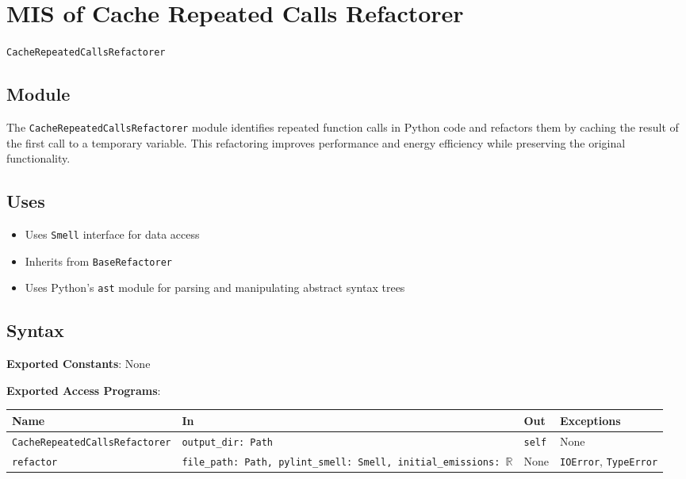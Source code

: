 \documentclass[12pt, titlepage]{article}
\begin{document}
\newpage

\section{MIS of Cache Repeated Calls Refactorer} \label{mis:CacheCalls}

\texttt{CacheRepeatedCallsRefactorer}

\subsection{Module}

The \texttt{CacheRepeatedCallsRefactorer} module identifies repeated function calls in Python code and refactors them by caching the result of the first call to a temporary variable. This refactoring improves performance and energy efficiency while preserving the original functionality.

\subsection{Uses}
\begin{itemize}
  \item Uses \texttt{Smell} interface for data access
  \item Inherits from \texttt{BaseRefactorer}
  \item Uses Python's \texttt{ast} module for parsing and manipulating abstract syntax trees
\end{itemize}

\subsection{Syntax}
\noindent
\textbf{Exported Constants}: None

\noindent
\textbf{Exported Access Programs}:\\
\begin{tabularx}{\linewidth}{|l|>{\raggedright\arraybackslash}X|l|l|}
  \hline
  \textbf{Name} & \textbf{In} & \textbf{Out} & \textbf{Exceptions} \\\hline
  \texttt{CacheRepeatedCallsRefactorer} & \texttt{output\_dir: Path} & \texttt{self} & None \\
  \hline
  \texttt{refactor} & \texttt{file\_path: Path, pylint\_smell: Smell, initial\_emissions: $\mathbb{R}$} & None & \texttt{IOError}, \texttt{TypeError} \\
  \hline
\end{tabularx}
\end{document}

